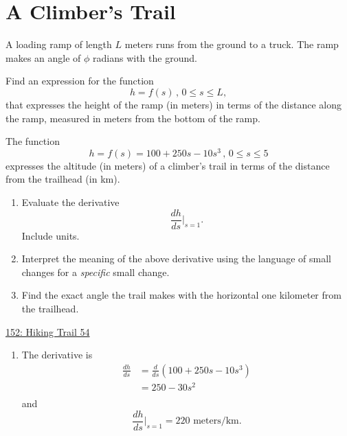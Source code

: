 \documentclass{ximera}
\begin{document}
\section{A Climber's Trail}

\begin{question}  \label{QPPDFrLMDECC}
A loading ramp of length $L$ meters runs from the ground to a truck. The ramp makes an angle of $\phi$ radians with the ground. 

Find an expression for the function 
\[
      h = f(s) \, , \, 0\leq s \leq L ,
\]
that expresses the height of the ramp (in meters) in terms of the distance along the ramp, measured in meters from the bottom of the ramp.
\end{question}

\begin{question} \label{QOIIdfsdftt444}
The function
\[
 h = f(s) =100+ 250s-10s^3 \, , \, 0\leq s \leq 5
\]
expresses the altitude (in meters) of a climber's trail in terms of the distance from the trailhead (in km). 

\begin{enumerate}

\item Evaluate the derivative
\[
   \frac{dh}{ds}\Big|_{s=1} .
\]
Include units.

\item Interpret the meaning of the above derivative using the language of small changes for a \emph{specific} small change.

\item Find the exact angle the trail makes with the horizontal one kilometer from the trailhead.

\end{enumerate}


\begin{onlineOnly}
    \begin{center}
\end{center}
\end{onlineOnly}

\href{https://www.desmos.com/calculator/ljcugfqmee}{152: Hiking Trail 54}

\begin{explanation}
\begin{enumerate}
\item The derivative is
\begin{align*}
    \frac{dh}{ds} &= \frac{d}{ds}(  100+ 250s-10s^3 ) \\
                         &= 250 - 30s^2 \\
\end{align*}
and
\[
  \frac{dh}{ds}\Big|_{s=1}  = 220 \text{ meters/km} .
\]


\end{enumerate}
\end{explanation}
\end{question}
\end{document}
